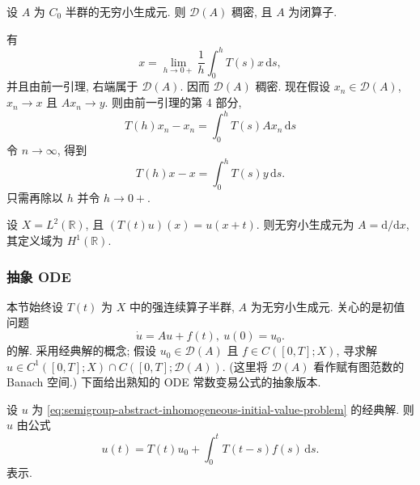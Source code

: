 \begin{Theorem}
\label{thm:semigroup-generator-dense-closed}
设 $A$ 为 $C_0$ 半群的无穷小生成元. 则 $\mathcal{D}(A)$ 稠密, 且 $A$ 为闭算子.
\end{Theorem}

\begin{Proof}
有
\begin{equation}\label{eq:semigroup-generator-domain-dense-average-approximation}
x=\lim_{h\to0+}\dfrac{1}{h}\int_0^h T(s)x\,\mathrm{d}s,
\end{equation}
并且由前一引理, 右端属于 $\mathcal{D}(A)$. 因而 $\mathcal{D}(A)$ 稠密. 现在假设 $x_n\in\mathcal{D}(A)$, $x_n\to x$ 且 $Ax_n\to y$. 则由前一引理的第 4 部分,
\begin{equation}\label{eq:semigroup-generator-closedness-sequence-identity}
T(h)x_n-x_n=\int_0^h T(s)Ax_n\,\mathrm{d}s
\end{equation}
令 $n\to\infty$, 得到
\begin{equation}\label{eq:semigroup-generator-closedness-limit-identity}
T(h)x-x=\int_0^h T(s)y\,\mathrm{d}s.
\end{equation}
只需再除以 $h$ 并令 $h\to0+$.
\end{Proof}

\begin{Example}
\label{ex:ltwo-translation-generator}
设 $X=L^2(\mathbb{R})$, 且 $(T(t)u)(x)=u(x+t)$. 则无穷小生成元为 $A=\mathrm{d}/\mathrm{d}x$, 其定义域为 $H^1(\mathbb{R})$.
\end{Example}

\subsubsection{抽象 ODE}\label{subsec:semigroup-abstract-odes}

本节始终设 $T(t)$ 为 $X$ 中的强连续算子半群, $A$ 为无穷小生成元. 关心的是初值问题
\begin{equation}\label{eq:semigroup-abstract-inhomogeneous-initial-value-problem}
\dot u=Au+f(t),\ u(0)=u_0.
\end{equation}
的解. 采用经典解的概念; 假设 $u_0\in\mathcal{D}(A)$ 且 $f\in C([0,T];X)$, 寻求解 $u\in C^1([0,T];X)\cap C([0,T];\mathcal{D}(A))$. (这里将 $\mathcal{D}(A)$ 看作赋有图范数的 Banach 空间.) 下面给出熟知的 ODE 常数变易公式的抽象版本.

\begin{Theorem}
\label{thm:semigroup-variation-of-constants}
设 $u$ 为 \eqref{eq:semigroup-abstract-inhomogeneous-initial-value-problem} 的经典解. 则 $u$ 由公式
\begin{equation}\label{eq:semigroup-variation-of-constants-formula}
u(t)=T(t)u_0+\int_0^t T(t-s)f(s)\,\mathrm{d}s.
\end{equation}
表示.
\end{Theorem}

